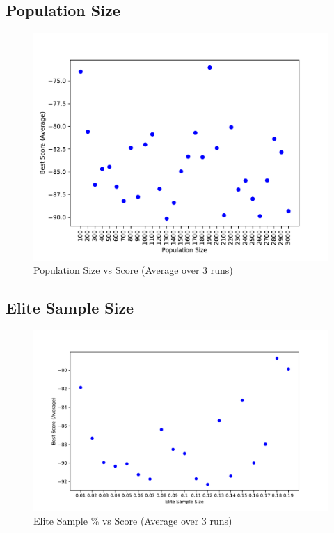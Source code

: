 \documentclass[conference,letterpaper]{IEEEtran}
\begin{document}
\subsection{Population Size}
\begin{figure}[H]
    \includegraphics[scale=0.55]{CE_population}
    \caption{Population Size vs Score (Average over 3 runs)}
    \label{ce population}
\end{figure}

\subsection{Elite Sample Size}
\begin{figure}[H]
    \includegraphics[scale=0.45]{CE_elitesample}
    \caption{Elite Sample \% vs Score (Average over 3 runs)}
    \label{ce elitesample}
\end{figure}
\end{document}
